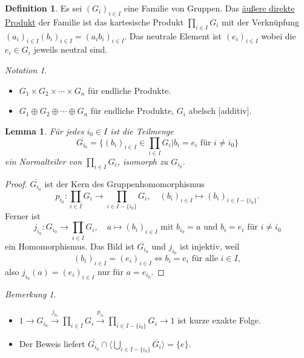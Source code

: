 \documentclass[12pt]{scrartcl} %
\newtheorem{lemma}{Lemma}
\theoremstyle{definition}
\newtheorem*{defn}{Definition}
\theoremstyle{remark}
\newtheorem*{notation}{Notation}
\newtheorem*{nb}{Bemerkung}
\newcommand{\defi}{\underline}
\begin{document}
\begin{defn}
	Es sei $(G_i)_{i \in I}$ eine Familie von Gruppen.
	Das \defi{äußere direkte Produkt} der Familie ist das kartesische Produkt $\prod_{i \in I}G_i$ mit der Verknüpfung $(a_i)_{i \in I} (b_i)_{i \in I} = (a_ib_i)_{i \in I}$.
	Das neutrale Element ist $(e_i)_{i \in I}$ wobei die $e_i \in G_i$ jeweils neutral sind.
\end{defn}

\begin{notation}
	\begin{itemize}
	\item $G_1 \times G_2 \times \dotsb \times G_n$ für endliche Produkte.
	\item $G_1 \oplus G_2 \oplus \dotsb \oplus G_n$ für endliche Produkte, $G_i$ abelsch [additiv].
	\end{itemize}
\end{notation}

\begin{lemma}
	Für jedes $i_0 \in I$ ist die Teilmenge
	$$ \overline{G_{i_0}} = \{(b_i)_{i \in I} \in \prod_{i \in I}G_i | b_i = e_i \text{ für } i \neq i_0\} $$
	ein Normalteiler von $\prod_{i \in I}G_i$, isomorph zu $G_{i_0}$.
\end{lemma}

\begin{proof}
	$\overline{G_{i_0}}$ ist der Kern des Gruppenhomomorphismus
	$$p_{i_0}: \prod_{i \in I}G_i \rightarrow \prod_{i \in I-\{i_0\}}G_i, \quad (b_i)_{i \in I} \mapsto (b_i)_{i \in I-\{i_0\}}.$$ %
	Ferner ist
	$$j_{i_0}: G_{i_0} \rightarrow \prod_{i \in I}G_i, \quad a \mapsto (b_i)_{i \in I} \text{ mit \(b_{i_0}=a\) und \(b_i = e_i \text{ für } i \neq i_0\)}$$
	ein Homomorphismus.
	Das Bild ist $\overline{G_{i_0}}$ und $j_{i_0}$ ist injektiv, weil
	$$(b_i)_{i \in I} = (e_i)_{i \in I} \Leftrightarrow b_i = e_i \text{ für alle } i \in I,$$
	also \(j_{i_0}(a) = (e_i)_{i \in I}\) nur für \(a = e_{i_0}\).
\end{proof}

\begin{nb}
	\begin{itemize}
		\item $1 \longrightarrow G_{i_0} \stackrel{j_{i_0}}{\longrightarrow} \prod_{i \in I}G_i \stackrel{p_{i_0}}{\longrightarrow} \prod_{i \in I-\{i_0\}}G_i \longrightarrow 1$ ist kurze exakte Folge.
		\item Der Beweis liefert $\overline{G_{i_0}} \cap \langle \bigcup_{i \in I-\{i_0\}}\overline{G_i} \rangle = \{e\}$.
	\end{itemize}
\end{nb}
\end{document}
